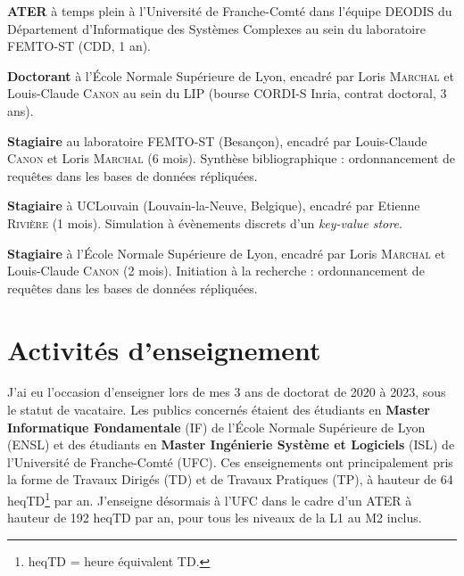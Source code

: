 \documentclass[12pt]{article}
\newcommand{\cvitem}[2]{\item[#1] #2}
\newcounter{cvitems}
\begin{document}
\begin{cvitems}
    \cvitem{2023--2024}{\textbf{ATER} à temps plein à l'Université de Franche-Comté dans l'équipe
    DEODIS du Département d'Informatique des Systèmes Complexes au sein du laboratoire FEMTO-ST
    (CDD, 1 an).}

    \cvitem{2020--2023}{\textbf{Doctorant} à l'École Normale Supérieure de Lyon, encadré par Loris
    \textsc{Marchal} et Louis-Claude \textsc{Canon} au sein du LIP (bourse CORDI-S Inria, contrat
    doctoral, 3 ans).}

    \cvitem{2020}{\textbf{Stagiaire} au laboratoire FEMTO-ST (Besançon), encadré par Louis-Claude
    \textsc{Canon} et Loris \textsc{Marchal} (6 mois).  
    Synthèse bibliographique : ordonnancement de requêtes dans les bases de données répliquées.}

    \cvitem{2019}{\textbf{Stagiaire} à UCLouvain (Louvain-la-Neuve, Belgique), encadré par Etienne
    \textsc{Rivière} (1 mois).  
    Simulation à évènements discrets d'un \emph{key-value store}.}

    \cvitem{2019}{\textbf{Stagiaire} à l'École Normale Supérieure de Lyon, encadré par Loris
    \textsc{Marchal} et Louis-Claude \textsc{Canon} (2 mois).  
    Initiation à la recherche : ordonnancement de requêtes dans les bases de données répliquées.}
\end{cvitems}

\section{Activités d'enseignement}

J'ai eu l'occasion d'enseigner lors de mes 3 ans de doctorat de 2020 à 2023, sous le statut de
vacataire.  
Les publics concernés étaient des étudiants en \textbf{Master Informatique Fondamentale} (IF) de
l'École Normale Supérieure de Lyon (ENSL) et des étudiants en \textbf{Master Ingénierie Système et
Logiciels} (ISL) de l'Université de Franche-Comté (UFC).  
Ces enseignements ont principalement pris la forme de Travaux Dirigés (TD) et de Travaux Pratiques
(TP), à hauteur de 64 heqTD\footnote{heqTD = heure équivalent TD.} par an.  
J'enseigne désormais à l'UFC dans le cadre d'un ATER à hauteur de 192 heqTD par an, pour tous les
niveaux de la L1 au M2 inclus.
\end{document}
